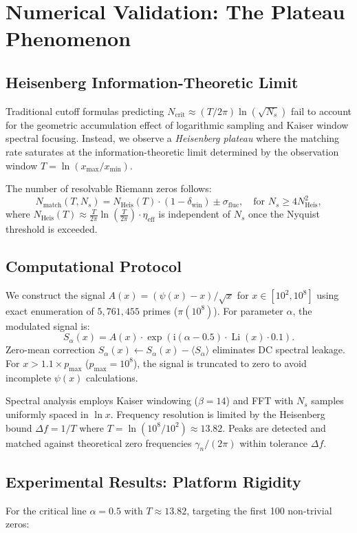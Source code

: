 \documentclass[12pt,a4paper]{article}
\theoremstyle{definition}
\theoremstyle{plain}
\theoremstyle{remark}
\DeclareMathOperator{\Li}{Li}
\newcommand{\ii}{\mathrm{i}}
\begin{document}
\section{Numerical Validation: The Plateau Phenomenon}

\subsection{Heisenberg Information-Theoretic Limit}
Traditional cutoff formulas predicting $N_{\text{crit}} \approx (T/2\pi)\ln(\sqrt{N_s})$ fail to account for the geometric accumulation effect of logarithmic sampling and Kaiser window spectral focusing. Instead, we observe a \textit{Heisenberg plateau} where the matching rate saturates at the information-theoretic limit determined by the observation window $T = \ln(x_{\max}/x_{\min})$.

The number of resolvable Riemann zeros follows:
\[
N_{\text{match}}(T, N_s) = N_{\text{Heis}}(T) \cdot (1 - \delta_{\text{win}}) \pm \sigma_{\text{fluc}}, \quad \text{for } N_s \geq 4N_{\text{Heis}}^2,
\]
where $N_{\text{Heis}}(T) \approx \frac{T}{2\pi}\ln\left(\frac{T}{2\pi}\right) \cdot \eta_{\text{eff}}$ is independent of $N_s$ once the Nyquist threshold is exceeded.

\subsection{Computational Protocol}
We construct the signal $A(x) = (\psi(x) - x)/\sqrt{x}$ for $x \in [10^2, 10^8]$ using exact enumeration of $5,761,455$ primes ($\pi(10^8)$). For parameter $\alpha$, the modulated signal is:
\[
S_\alpha(x) = A(x) \cdot \exp\left(\ii (\alpha - 0.5) \cdot \Li(x) \cdot 0.1\right).
\]
Zero-mean correction $S_\alpha(x) \leftarrow S_\alpha(x) - \langle S_\alpha \rangle$ eliminates DC spectral leakage. For $x > 1.1 \times p_{\max}$ ($p_{\max} = 10^8$), the signal is truncated to zero to avoid incomplete $\psi(x)$ calculations.

Spectral analysis employs Kaiser windowing ($\beta = 14$) and FFT with $N_s$ samples uniformly spaced in $\ln x$. Frequency resolution is limited by the Heisenberg bound $\Delta f = 1/T$ where $T = \ln(10^8/10^2) \approx 13.82$. Peaks are detected and matched against theoretical zero frequencies $\gamma_n/(2\pi)$ within tolerance $\Delta f$.

\subsection{Experimental Results: Platform Rigidity}
For the critical line $\alpha = 0.5$ with $T \approx 13.82$, targeting the first 100 non-trivial zeros:
\end{document}
